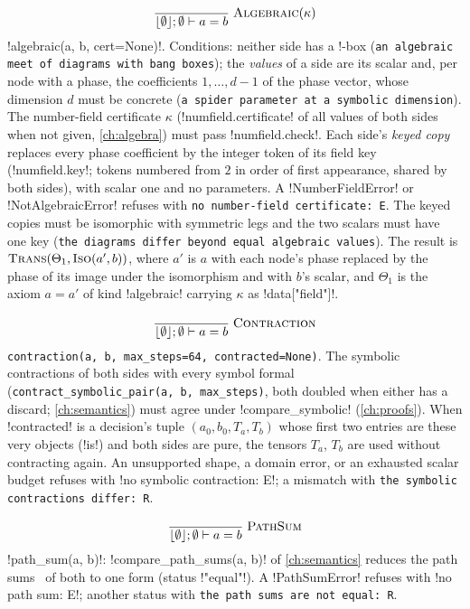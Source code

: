 \[
\frac{}{\lfloor\emptyset\rfloor;\emptyset\vdash a=b}\;\textsc{Algebraic}(\kappa)
\]
\py!algebraic(a, b, cert=None)!. Conditions: neither side has a !-box (\texttt{an algebraic meet of diagrams with bang boxes}); the \emph{values} of a side are its scalar and, per node with a phase, the coefficients $1,\ldots,d-1$ of the phase vector, whose dimension $d$ must be concrete (\texttt{a spider parameter at a symbolic dimension}). The number-field certificate $\kappa$ (\py!numfield.certificate! of all values of both sides when not given, \cref{ch:algebra}) must pass \py!numfield.check!. Each side's \emph{keyed copy} replaces every phase coefficient by the integer token of its field key (\py!numfield.key!; tokens numbered from $2$ in order of first appearance, shared by both sides), with scalar one and no parameters. A \py!NumberFieldError! or \py!NotAlgebraicError! refuses with \texttt{no number-field certificate: E}. The keyed copies must be isomorphic with symmetric legs and the two scalars must have one key (\texttt{the diagrams differ beyond equal algebraic values}). The result is $\textsc{Trans}(\Theta_1, \textsc{Iso}(a', b))$, where $a'$ is $a$ with each node's phase replaced by the phase of its image under the isomorphism and with $b$'s scalar, and $\Theta_1$ is the axiom $a=a'$ of kind \code!algebraic! carrying $\kappa$ as \code!data["field"]!.

\[
\frac{}{\lfloor\emptyset\rfloor;\emptyset\vdash a=b}\;\textsc{Contraction}
\]
\texttt{contraction(\allowbreak{}a,\allowbreak{} b,\allowbreak{} max\_\allowbreak{}steps=64,\allowbreak{} contracted=None)}. The symbolic contractions of both sides with every symbol formal (\texttt{contract\_\allowbreak{}symbolic\_\allowbreak{}pair(\allowbreak{}a,\allowbreak{} b,\allowbreak{} max\_\allowbreak{}steps)}, both doubled when either has a discard; \cref{ch:semantics}) must agree under \py!compare_symbolic! (\cref{ch:proofs}). When \code!contracted! is a decision's tuple $(a_0, b_0, T_a, T_b)$ whose first two entries are these very objects (\py!is!) and both sides are pure, the tensors $T_a$, $T_b$ are used without contracting again. An unsupported shape, a domain error, or an exhausted scalar budget refuses with \code!no symbolic contraction: E!; a mismatch with \texttt{the symbolic contractions differ: R}.

\[
\frac{}{\lfloor\emptyset\rfloor;\emptyset\vdash a=b}\;\textsc{PathSum}
\]
\py!path_sum(a, b)!: \py!compare_path_sums(a, b)! of \cref{ch:semantics} reduces the path sums~\cite{amy2018pathsums} of both to one form (status \code!"equal"!). A \py!PathSumError! refuses with \code!no path sum: E!; another status with \texttt{the path sums are not equal: R}.

